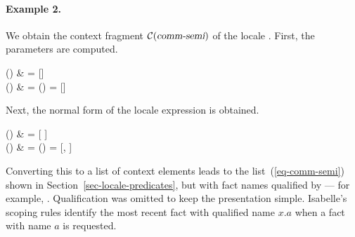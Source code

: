\begin{isabellebody}
\begin{isamarkuptext}
\paragraph{Example 2.}
  We obtain the context fragment $\mathcal{C}(\emph{\sl comm{\mbox{-}}semi})$ of the
  locale .  First, the parameters are computed.
\begin{align*%
}
  \pi() & = [] \\
  \pi() & = \pi() \App []
     = []
\end{align*%
}
  Next, the normal form of the locale expression
   is obtained.
\begin{align*%
}
  \N() & = [ ] \\
  \N() & = \N() 
   = [, ]
\end{align*%
}
  Converting this to a list of context elements leads to the
  list~(\ref{eq-comm-semi}) shown in
  Section~\ref{sec-locale-predicates}, but with fact names qualified
  by  --- for example, .
  Qualification was omitted to keep the presentation simple.
  Isabelle's scoping rules identify the most recent fact with
  qualified name $x.a$ when a fact with name $a$ is requested.


\end{isamarkuptext}
\end{isabellebody}
